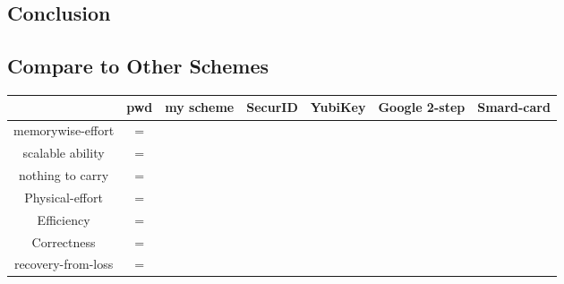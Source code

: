 \begin{CJK}{Bg5}{bsmi}


\chapter{Conclusion}

\section{Compare to Other Schemes}

\begin{table}[h]
\begin{tabular}{|c|c|c|c|c|c|c|}
\hline
                   & pwd & my scheme & SecurID & YubiKey & Google 2-step & Smard-card \\ \hline
memorywise-effort  & =   &           &         &         &               &            \\ \hline
scalable ability   & =   &           &         &         &               &            \\ \hline
nothing to carry   & =   &           &         &         &               &            \\ \hline
Physical-effort    & =   &           &         &         &               &            \\ \hline
Efficiency         & =   &           &         &         &               &            \\ \hline
Correctness        & =   &           &         &         &               &            \\ \hline
recovery-from-loss & =   &           &         &         &               &            \\ \hline
\end{tabular}
\end{table}


\end{CJK}
